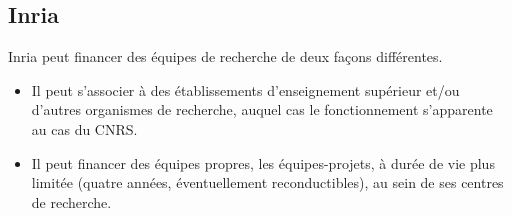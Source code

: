 \subsection{Inria}

Inria peut financer des \'equipes de recherche de deux fa\c cons
diff\'erentes.

\begin{itemize}
\item Il peut s'associer \`a des \'etablissements d'enseignement
sup\'erieur et/ou d'autres organismes de recherche, auquel cas le
fonctionnement s'apparente au cas du CNRS.
\item Il peut financer des \'equipes propres, les \'equipes-projets, \`a dur\'ee
de vie plus limit\'ee (quatre ann\'ees, \'eventuel\-le\-ment
reconductibles), au sein de ses centres de recherche.
\end{itemize}
